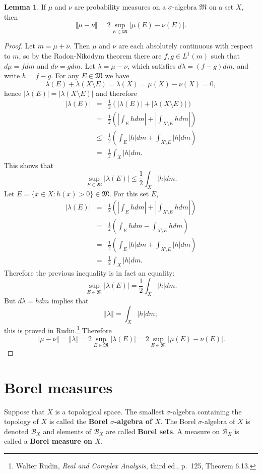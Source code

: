 \documentclass{article}
\newcommand{\norm}[1]{\left\Vert #1 \right\Vert}
\theoremstyle{definition}
\newtheorem{lemma}[theorem]{Lemma}
\theoremstyle{definition}
\begin{document}
\begin{lemma}
If $\mu$ and $\nu$ are probability measures on a $\sigma$-algebra $\mathfrak{M}$ on a set $X$, then 
\[
\norm{\mu-\nu} = 2\sup_{E \in \mathfrak{M}} |\mu(E)-\nu(E)|.
\]
\label{totvariationmetric}
\end{lemma}
\begin{proof}
Let $m=\mu+\nu$. Then $\mu$ and $\nu$ are each absolutely continuous with respect to $m$, so
by the Radon-Nikodym theorem there are $f,g \in L^1(m)$ such that 
$d\mu = f dm$ and $d\nu = g dm$. 
Let $\lambda=\mu-\nu$, which satisfies $d\lambda = (f-g) dm$, and write $h=f-g$. 
For any $E \in \mathfrak{M}$ we have
\[
\lambda(E)+\lambda(X \setminus E) = \lambda(X) = \mu(X) - \nu(X) = 0,
\]
hence $|\lambda(E)|=|\lambda(X \setminus E)|$ and therefore
\begin{eqnarray*}
|\lambda(E)|&=&\frac{1}{2}(|\lambda(E)|+|\lambda(X \setminus E)|)\\
&=&\frac{1}{2}\left(\left| \int_E h dm\right|+\left|\int_{X \setminus E} h dm\right| \right)\\
&\leq&\frac{1}{2}\left( \int_E |h| dm + \int_{X \setminus E} |h| dm\right)\\
&=&\frac{1}{2}\int_X |h| dm.
\end{eqnarray*}
This shows that
\[
\sup_{E \in \mathfrak{M}} |\lambda(E)| \leq \frac{1}{2}\int_X |h| dm.
\]
Let $E=\{x \in X: h(x)>0\} \in \mathfrak{M}$. For this set $E$,
\begin{eqnarray*}
|\lambda(E)|&=&\frac{1}{2}\left(\left| \int_E h dm\right|+\left|\int_{X \setminus E} h dm\right| \right)\\
&=&\frac{1}{2}\left( \int_E h dm - \int_{X \setminus E}  h dm\right)\\
&=&\frac{1}{2}\left( \int_E |h| dm + \int_{X \setminus E} |h| dm\right)\\
&=&\frac{1}{2} \int_X |h| dm.
\end{eqnarray*}
Therefore the previous inequality is in fact an equality:
\[
\sup_{E \in \mathfrak{M}} |\lambda(E)| = \frac{1}{2}\int_X |h| dm.
\]
But  $d\lambda = h dm$ implies that
\[
\norm{\lambda} = \int_X |h| dm;
\]
this is proved in Rudin.\footnote{Walter Rudin, {\em Real and Complex Analysis}, third ed., p.~125, Theorem 6.13.}
Therefore
\[
\norm{\mu-\nu}=\norm{\lambda}=2\sup_{E \in \mathfrak{M}} |\lambda(E)| = 2 \sup_{E \in \mathfrak{M}} |\mu(E)-\nu(E)|.
\]
\end{proof}


\section{Borel measures}
Suppose that $X$ is a topological space. The smallest $\sigma$-algebra containing the topology of $X$ is called
the \textbf{Borel $\sigma$-algebra of $X$}. The Borel $\sigma$-algebra of $X$ is denoted $\mathscr{B}_X$ and elements of $\mathscr{B}_X$
are called \textbf{Borel sets}. 
A measure on $\mathscr{B}_X$ is called a \textbf{Borel measure on $X$}.
\end{document}
